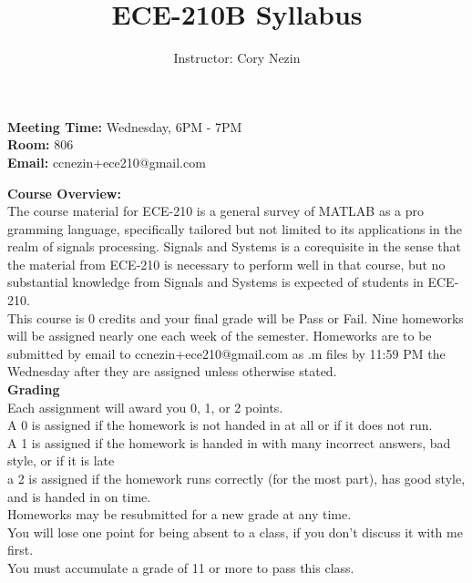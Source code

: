 \documentclass[11pt]{article}
\begin{document}
\title{ECE-210B Syllabus}
\author{Instructor: Cory Nezin}
\maketitle

\textbf{Meeting Time:} Wednesday, 6PM - 7PM \\
\textbf{Room:} 806 \\
\textbf{Email:} ccnezin+ece210@gmail.com

\textbf{Course Overview:}\\
The course material for ECE-210 is a general survey of MATLAB as a pro
gramming language, specifically tailored but not limited to its applications in the realm of signals
processing. Signals and Systems is a corequisite in the sense that the material from ECE-210 is
necessary to perform well in that course, but no substantial knowledge from Signals and Systems
is expected of students in ECE-210.\\

This course is 0 credits and your final grade will be Pass or Fail. Nine homeworks will be assigned
nearly one each week of the semester. Homeworks are to be submitted by email to ccnezin+ece210@gmail.com
as .m files by 11:59 PM the Wednesday after they are assigned unless otherwise stated.\\

\textbf{Grading}\\
Each assignment will award you 0, 1, or 2 points. \\

A 0 is assigned if the homework is not handed in at all or if it does not run. \\

A 1 is assigned if the homework is handed in with many incorrect answers, bad style, or if it is late\\

a 2 is assigned if the homework runs correctly (for the most part), has good style, and is handed in on time.\\

Homeworks may be resubmitted for a new grade at any time.\\

You will lose one point for being absent to a class, if you don't discuss it with me first.\\

You must accumulate a grade of 11 or more to pass this class.\\
\end{document}
